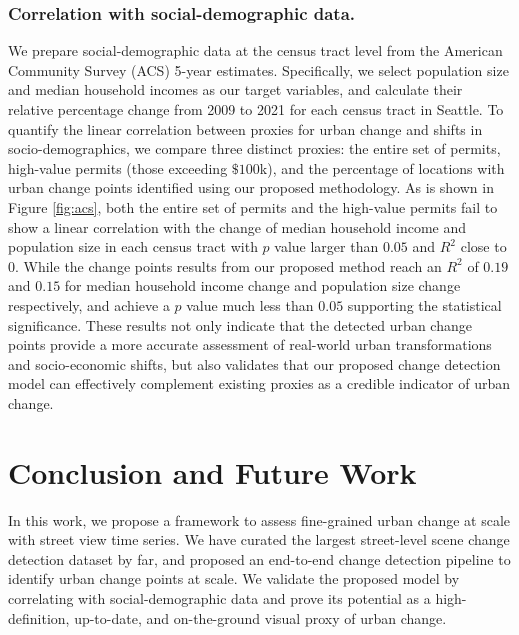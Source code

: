 \documentclass[letterpaper]{article} %
\begin{document}
\subsubsection{Correlation with social-demographic data.}
We prepare social-demographic data at the census tract level from the American Community Survey (ACS) 5-year estimates. Specifically, we select population size and median household incomes as our target variables, and calculate their relative percentage change from 2009 to 2021 for each census tract in Seattle.
To quantify the linear correlation between proxies for urban change and shifts in socio-demographics, we compare three distinct proxies: the entire set of permits, high-value permits (those exceeding $\$100$k), and the percentage of locations with urban change points identified using our proposed methodology.
As is shown in Figure \ref{fig:acs}, both the entire set of permits and the high-value permits fail to show a linear correlation with the change of median household income and population size in each census tract with $p$ value larger than $0.05$ and $R^2$ close to $0$.
While the change points results from our proposed method reach an $R^2$ of $0.19$ and $0.15$ for median household income change and population size change respectively, and achieve a $p$ value much less than $0.05$ supporting the statistical significance.
These results not only indicate that the detected urban change points provide a more accurate assessment of real-world urban transformations and socio-economic shifts, but also validates that our proposed change detection model can effectively complement existing proxies as a credible indicator of urban change.

\section{Conclusion and Future Work}
In this work, we propose a framework to assess fine-grained urban change at scale with street view time series. We have curated the largest street-level scene change detection dataset by far, and proposed an end-to-end change detection pipeline to identify urban change points at scale. We validate the proposed model by correlating with social-demographic data and prove its potential as a high-definition, up-to-date, and on-the-ground visual proxy of urban change.
\end{document}
